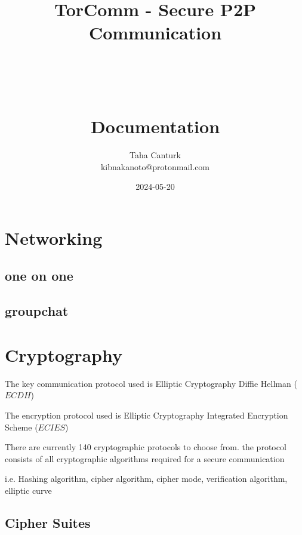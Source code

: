 \documentclass[a4paper,12pt]{article}
\title{
	\Huge TorComm - Secure P2P Communication \\
	\ \\
	\ \\
	\ \\
	\Large Documentation
}
\author{Taha Canturk\\kibnakanoto@protonmail.com}
\date{2024-05-20}
\begin{document}
\maketitle

\newpage


\newpage

\tableofcontents

\newpage


\section{Networking}

\subsection{one on one}

\subsection{groupchat}

\section{Cryptography}

The key communication protocol used is Elliptic Cryptography Diffie Hellman ($ECDH$)

The encryption protocol used is Elliptic Cryptography Integrated Encryption Scheme ($ECIES$)

There are currently 140 cryptographic protocols to choose from. the protocol consists of all cryptographic algorithms required for a secure communication

i.e. Hashing algorithm, cipher algorithm, cipher mode, verification algorithm, elliptic curve

\subsection{Cipher Suites}

\tiny
\end{document}
